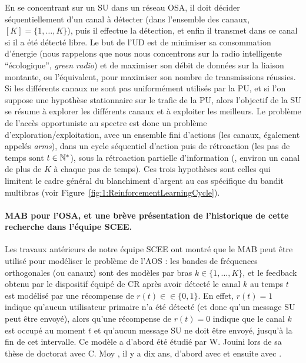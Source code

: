 \begin{resume_fr}
En se concentrant sur un SU dans un réseau OSA, il doit décider séquentiellement d'un canal à détecter (dans l'ensemble des canaux, $[K]=\{1,\dots,K\}$), puis il effectue la détection, et enfin il transmet dans ce canal si il a été détecté libre.
Le but de l'UD est de minimiser sa consommation d'énergie (nous rappelons que nous nous concentrons sur la radio intelligente ``écologique'', \emph{green radio}) et de maximiser son débit de données sur la liaison montante, ou l'équivalent, pour maximiser son nombre de transmissions réussies.
%
Si les différents canaux ne sont pas uniformément utilisés par la PU, et si l'on suppose une hypothèse stationnaire sur le trafic de la PU, alors l'objectif de la SU se résume à explorer les différents canaux et à exploiter les meilleurs.
Le problème de l'accès opportuniste au spectre est donc un problème d'exploration/exploitation, avec un ensemble fini d'actions (les canaux, également appelés \emph{arms}),
dans un cycle séquentiel d'action puis de rétroaction (les pas de temps sont $t\in\mathbb{N}^*$),
sous la rétroaction partielle d'information (\ie, environ un canal de plus de $K$ à chaque pas de temps).
Ces trois hypothèses sont celles qui limitent le cadre général du blanchiment d'argent au cas spécifique du bandit multibras (voir Figure~\ref{fig:1:ReinforcementLearningCycle}).


\paragraph{MAB pour l'OSA, et une brève présentation de l'historique de cette recherche dans l'équipe SCEE.}
%
Les travaux antérieurs de notre équipe SCEE ont montré que le MAB peut être utilisé pour modéliser le problème de l'AOS :
les bandes de fréquences orthogonales (ou canaux) sont des modèles par bras $k\in\{1,\dots,K\}$,
et le feedback obtenu par le dispositif équipé de CR après avoir détecté le canal $k$ au temps $t$ est modélisé par une récompense de $r(t) \in \in \{0,1\}$.
En effet, $r(t) = 1$ indique qu'aucun utilisateur primaire n'a été détecté (et donc qu'un message SU peut être envoyé), alors qu'une récompense de $r(t)=0$ indique que le canal $k$ est occupé au moment $t$ et qu'aucun message SU ne doit être envoyé, jusqu'à la fin de cet intervalle.
%
Ce modèle a d'abord été étudié par W. Jouini lors de sa thèse de doctorat avec C. Moy \cite{Jouini12PhD}, il y a dix ans, d'abord avec \cite{Jouini09} et ensuite avec \cite{Jouini10,Jouini12}.


\end{resume_fr}
